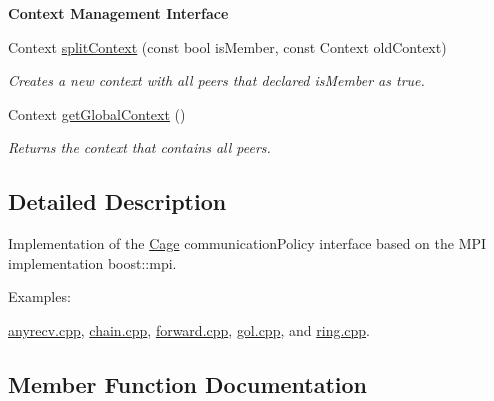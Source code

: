 \begin{Indent}{\bf Context Management Interface}\par
\begin{DoxyCompactItemize}
\item 
\hypertarget{structgraybat_1_1communicationPolicy_1_1BMPI_a4c65002f731605e7e6d80acdc1d4c678}{}Context \hyperlink{structgraybat_1_1communicationPolicy_1_1BMPI_a4c65002f731605e7e6d80acdc1d4c678}{split\+Context} (const bool is\+Member, const Context old\+Context)\label{structgraybat_1_1communicationPolicy_1_1BMPI_a4c65002f731605e7e6d80acdc1d4c678}

\begin{DoxyCompactList}\small\item\em Creates a new context with all peers that declared is\+Member as true. \end{DoxyCompactList}\item 
\hypertarget{structgraybat_1_1communicationPolicy_1_1BMPI_aaaaaec7667d29a126cfc883cf552da31}{}Context \hyperlink{structgraybat_1_1communicationPolicy_1_1BMPI_aaaaaec7667d29a126cfc883cf552da31}{get\+Global\+Context} ()\label{structgraybat_1_1communicationPolicy_1_1BMPI_aaaaaec7667d29a126cfc883cf552da31}

\begin{DoxyCompactList}\small\item\em Returns the context that contains all peers. \end{DoxyCompactList}\end{DoxyCompactItemize}
\end{Indent}


\subsection{Detailed Description}
Implementation of the \hyperlink{structgraybat_1_1Cage}{Cage} communication\+Policy interface based on the M\+P\+I implementation boost\+::mpi. \begin{Desc}
\item[Examples\+: ]\par
\hyperlink{anyrecv_8cpp-example}{anyrecv.\+cpp}, \hyperlink{chain_8cpp-example}{chain.\+cpp}, \hyperlink{forward_8cpp-example}{forward.\+cpp}, \hyperlink{gol_8cpp-example}{gol.\+cpp}, and \hyperlink{ring_8cpp-example}{ring.\+cpp}.\end{Desc}


\subsection{Member Function Documentation}
\hypertarget{structgraybat_1_1communicationPolicy_1_1BMPI_abadfee42ac90516c1158292da79b0345}{}
